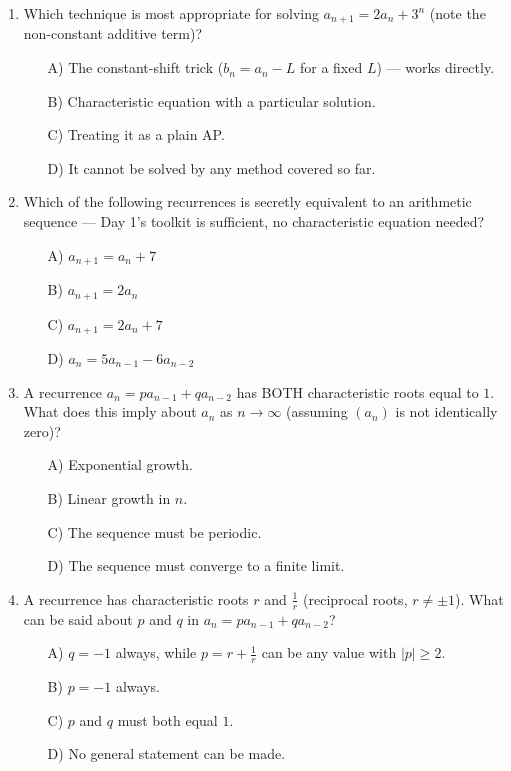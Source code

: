 \documentclass[11pt,a4paper]{article}
\begin{document}
\begin{enumerate}
\item Which technique is most appropriate for solving $a_{n+1}=2a_n+3^n$ (note the non-constant additive term)?
\begin{itemize}
\item[A)] The constant-shift trick ($b_n=a_n-L$ for a fixed $L$) --- works directly.
\item[B)] Characteristic equation with a particular solution.
\item[C)] Treating it as a plain AP.
\item[D)] It cannot be solved by any method covered so far.
\end{itemize}

\item Which of the following recurrences is secretly equivalent to an arithmetic sequence --- Day 1's toolkit is sufficient, no characteristic equation needed?
\begin{itemize}
\item[A)] $a_{n+1}=a_n+7$
\item[B)] $a_{n+1}=2a_n$
\item[C)] $a_{n+1}=2a_n+7$
\item[D)] $a_n=5a_{n-1}-6a_{n-2}$
\end{itemize}

\item A recurrence $a_n=pa_{n-1}+qa_{n-2}$ has BOTH characteristic roots equal to $1$. What does this imply about $a_n$ as $n\to\infty$ (assuming $(a_n)$ is not identically zero)?
\begin{itemize}
\item[A)] Exponential growth.
\item[B)] Linear growth in $n$.
\item[C)] The sequence must be periodic.
\item[D)] The sequence must converge to a finite limit.
\end{itemize}

\item A recurrence has characteristic roots $r$ and $\tfrac1r$ (reciprocal roots, $r\neq\pm1$). What can be said about $p$ and $q$ in $a_n=pa_{n-1}+qa_{n-2}$?
\begin{itemize}
\item[A)] $q=-1$ always, while $p=r+\tfrac1r$ can be any value with $|p|\geq2$.
\item[B)] $p=-1$ always.
\item[C)] $p$ and $q$ must both equal $1$.
\item[D)] No general statement can be made.
\end{itemize}

\end{enumerate}
\end{document}
